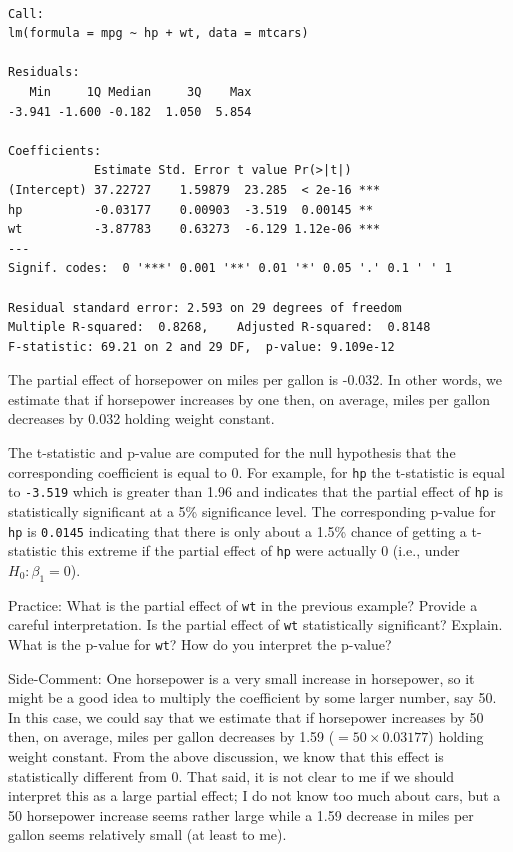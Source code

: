 \documentclass[
  letterpaper,
  DIV=11,
  numbers=noendperiod]{scrreprt}
\begin{document}
\begin{verbatim}

Call:
lm(formula = mpg ~ hp + wt, data = mtcars)

Residuals:
   Min     1Q Median     3Q    Max 
-3.941 -1.600 -0.182  1.050  5.854 

Coefficients:
            Estimate Std. Error t value Pr(>|t|)    
(Intercept) 37.22727    1.59879  23.285  < 2e-16 ***
hp          -0.03177    0.00903  -3.519  0.00145 ** 
wt          -3.87783    0.63273  -6.129 1.12e-06 ***
---
Signif. codes:  0 '***' 0.001 '**' 0.01 '*' 0.05 '.' 0.1 ' ' 1

Residual standard error: 2.593 on 29 degrees of freedom
Multiple R-squared:  0.8268,    Adjusted R-squared:  0.8148 
F-statistic: 69.21 on 2 and 29 DF,  p-value: 9.109e-12
\end{verbatim}

The partial effect of horsepower on miles per gallon is -0.032. In other
words, we estimate that if horsepower increases by one then, on average,
miles per gallon decreases by 0.032 holding weight constant.

The t-statistic and p-value are computed for the null hypothesis that
the corresponding coefficient is equal to 0. For example, for
\texttt{hp} the t-statistic is equal to \texttt{-3.519} which is greater
than 1.96 and indicates that the partial effect of \texttt{hp} is
statistically significant at a 5\% significance level. The corresponding
p-value for \texttt{hp} is \texttt{0.0145} indicating that there is only
about a 1.5\% chance of getting a t-statistic this extreme if the
partial effect of \texttt{hp} were actually 0 (i.e., under
\(H_0 : \beta_1=0\)).

{Practice: }What is the partial effect of \texttt{wt} in the previous
example? Provide a careful interpretation. Is the partial effect of
\texttt{wt} statistically significant? Explain. What is the p-value for
\texttt{wt}? How do you interpret the p-value?

{Side-Comment:} One horsepower is a very small increase in horsepower,
so it might be a good idea to multiply the coefficient by some larger
number, say 50. In this case, we could say that we estimate that if
horsepower increases by 50 then, on average, miles per gallon decreases
by 1.59 (\(=50 \times 0.03177\)) holding weight constant. From the above
discussion, we know that this effect is statistically different from 0.
That said, it is not clear to me if we should interpret this as a large
partial effect; I do not know too much about cars, but a 50 horsepower
increase seems rather large while a 1.59 decrease in miles per gallon
seems relatively small (at least to me).
\end{document}
